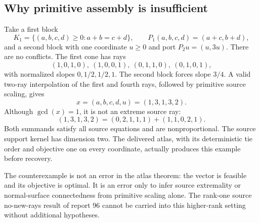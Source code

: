 \subsection{Why primitive assembly is insufficient}
\begin{example}
\label{ex:nonextreme}
Take a first block
\[
 K_1=\{(a,b,c,d)\ge0:a+b=c+d\},\qquad P_1(a,b,c,d)=(a+c,b+d),
\]
and a second block with one coordinate $u\ge0$ and port $P_2u=(u,3u)$. There are no conflicts. The first cone has rays
\[
 (1,0,1,0),\ (1,0,0,1),\ (0,1,1,0),\ (0,1,0,1),
\]
with normalized slopes $0,1/2,1/2,1$. The second block forces slope $3/4$. A valid two-ray interpolation of the first and fourth rays, followed by primitive source scaling, gives
\[
 x=(a,b,c,d,u)=(1,3,1,3,2).
\]
Although $\gcd(x)=1$, it is not an extreme source ray:
\begin{equation}
 (1,3,1,3,2)=(0,2,1,1,1)+(1,1,0,2,1).
 \label{eq:nonextreme-sum}
\end{equation}
Both summands satisfy all source equations and are nonproportional. The source support kernel has dimension two. The delivered atlas, with its deterministic tie order and objective one on every coordinate, actually produces this example before recovery.
\end{example}

The counterexample is not an error in the atlas theorem: the vector is feasible and its objective is optimal. It is an error only to infer source extremality or normal-surface connectedness from primitive scaling alone. The rank-one source no-new-rays result of report 96 cannot be carried into this higher-rank setting without additional hypotheses.

